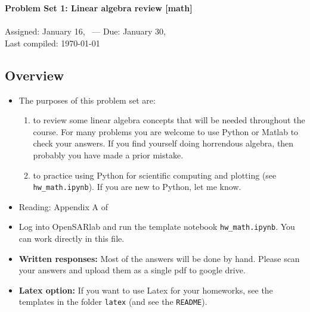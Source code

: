 \documentclass[11pt,titlepage,fleqn]{article}
\begin{document}

\begin{spacing}{1.2}
\centering
{\large \bf Problem Set 1: Linear algebra review [math]} \\
\cltag\ \\
Assigned: January 16, \cyear\ --- Due: January 30, \cyear\ \\
Last compiled: \today
\end{spacing}


\subsection*{Overview}

\begin{itemize}

\item The purposes of this problem set are:
%
\begin{enumerate}
\item  to review some linear algebra concepts that will be needed throughout the course.
For many problems you are welcome to use Python or Matlab to check your answers. If you find yourself doing horrendous algebra, then probably you have made a prior mistake.
\item to practice using Python for scientific computing and plotting (see \verb+hw_math.ipynb+).
If you are new to Python, let me know.
\end{enumerate}

\item Reading: Appendix A of \citet{Aster}

\item Log into OpenSARlab and run the template notebook \verb+hw_math.ipynb+. You can work directly in this file.

\item {\bf Written responses:}
Most of the answers will be done by hand. Please scan your answers and upload them as a single pdf to google drive.

\item {\bf Latex option:}
If you want to use Latex for your homeworks, see the templates in the folder \verb+latex+ (and see the \verb+README+).

\end{itemize}
\end{document}
